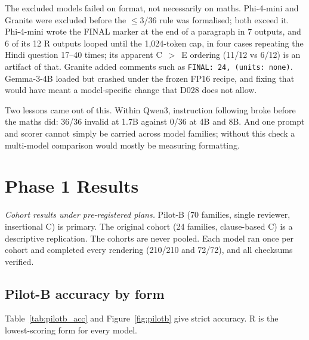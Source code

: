 \documentclass[12pt,a4paper,oneside]{report}
\renewcommand{\_}{\oldunderscore\allowbreak}
\begin{document}
The excluded models failed on format, not necessarily on maths. Phi-4-mini and Granite were excluded before the $\le$3/36 rule was formalised; both exceed it. Phi-4-mini wrote the FINAL marker at the end of a paragraph in 7 outputs, and 6 of its 12 R outputs looped until the 1,024-token cap, in four cases repeating the Hindi question 17--40 times; its apparent C~$>$~E ordering (11/12 vs 6/12) is an artifact of that. Granite added comments such as \texttt{FINAL: 24, (units: none)}. Gemma-3-4B loaded but crashed under the frozen FP16 recipe, and fixing that would have meant a model-specific change that D028 does not allow.

Two lessons came out of this. Within Qwen3, instruction following broke before the maths did: 36/36 invalid at 1.7B against 0/36 at 4B and 8B. And one prompt and scorer cannot simply be carried across model families; without this check a multi-model comparison would mostly be measuring formatting.

\chapter{Phase 1 Results}
\label{ch:results}

\noindent\textit{Cohort results under pre-registered plans.} Pilot-B (70 families, single reviewer, insertional C) is primary. The original cohort (24 families, clause-based C) is a descriptive replication. The cohorts are never pooled. Each model ran once per cohort and completed every rendering (210/210 and 72/72), and all checksums verified.

\section{Pilot-B accuracy by form}

Table~\ref{tab:pilotb_acc} and Figure~\ref{fig:pilotb} give strict accuracy. R is the lowest-scoring form for every model.
\end{document}
